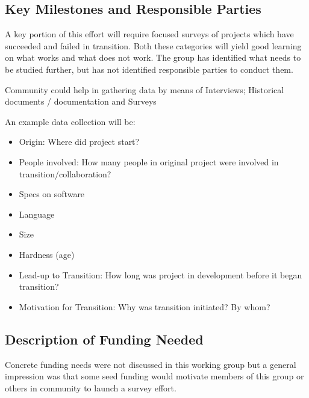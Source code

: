 \subsection{Key Milestones and Responsible Parties}
A key portion of this effort will require focused surveys of projects which have succeeded and failed in transition. Both these categories will yield good learning on what works and what does not work. The group has identified what needs to be studied further, but has not identified responsible parties to conduct them.

Community could help in gathering data by means of Interviews; Historical documents / documentation and Surveys

An example data collection will be: 
\begin{itemize}
\item Origin: Where did project start? 
\item People involved: How many people in original project were involved in transition/collaboration? 
\item Specs on software
\item Language
\item Size
\item Hardness (age)
\item Lead-up to Transition: How long was project in development before it began transition?
\item Motivation for Transition: Why was transition initiated? By whom? 
\end{itemize}

\subsection{Description of Funding Needed}
Concrete funding needs were not discussed in this working group but a general impression was that some seed funding would motivate members of this group or others in community to launch a survey effort. 
